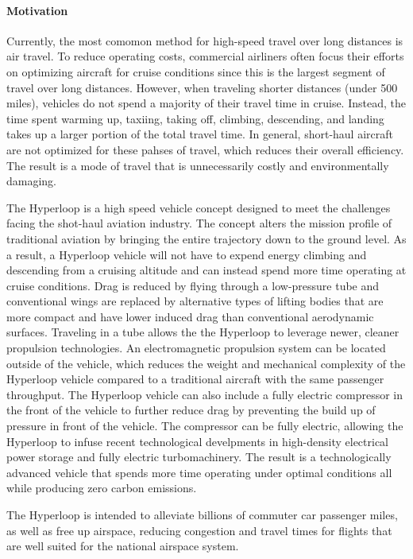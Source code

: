 \paragraph{Motivation}

	Currently, the most comomon method for high-speed travel over long distances is air travel.
	To reduce operating costs, commercial airliners often focus their efforts on optimizing aircraft for 
	cruise conditions since this is the largest segment of travel over long distances.
	However, when traveling shorter distances (under 500 miles), vehicles do not spend a majority of their travel time in cruise.
	Instead, the time spent warming up, taxiing, taking off, climbing, descending, and landing
	takes up a larger portion of the total travel time. In general, short-haul aircraft are not optimized 
	for these pahses of travel, which reduces their overall efficiency. The result is a mode of travel that is 
	unnecessarily costly and environmentally damaging.

	The Hyperloop is a high speed vehicle concept designed to meet the challenges facing the shot-haul aviation industry.
	The concept alters the mission profile of traditional aviation by bringing the entire trajectory down to the ground level.
	As a result, a Hyperloop vehicle will not have to expend energy climbing and descending from 
	a cruising altitude and can instead spend more time operating at cruise conditions. 
	Drag is reduced by flying through a low-pressure tube
	and conventional wings are replaced by alternative types of lifting bodies
	that are more compact and have lower induced drag than conventional aerodynamic surfaces. 
	Traveling in a tube allows the the Hyperloop to leverage newer, cleaner propulsion technologies.  
	An electromagnetic propulsion system can be located outside of the vehicle,
	which reduces the weight and mechanical complexity of the Hyperloop vehicle compared to a 
	traditional aircraft with the same passenger throughput.
	The Hyperloop vehicle can also include a fully electric compressor in the front of the vehicle to 
	further reduce drag by preventing the build up of pressure in front of the vehicle. 
	The compressor can be fully electric, allowing the Hyperloop to infuse recent technological develpments in 
	high-density electrical power storage and fully electric turbomachinery. 
	The result is a technologically advanced vehicle that spends more time operating under optimal conditions 
	all while producing zero carbon emissions.

	The Hyperloop is intended to alleviate billions of commuter car passenger miles,
	as well as free up airspace, reducing congestion and travel times for
	flights that are well suited for the national airspace system.

